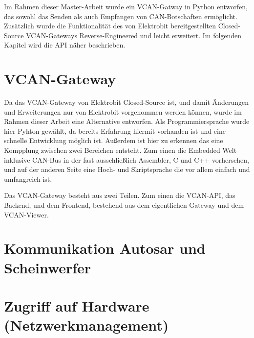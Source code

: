 \documentclass[
  a4paper,					    %
  twoside,
  DIV=calc,     				%
  bibliography=totoc,
  cleardoublepage=empty,
  ngerman,     					%
  final       					%
]{scrbook}
\begin{document}
Im Rahmen dieser Master-Arbeit wurde ein VCAN-Gatway in Python entworfen, das sowohl das Senden als auch Empfangen von CAN-Botschaften ermöglicht. Zusätzlich wurde die Funktionalität des von Elektrobit bereitgestellten Closed-Source VCAN-Gateways Reverse-Engineered und leicht erweitert. Im folgenden Kapitel wird die API näher beschrieben.



\section{VCAN-Gateway}
\label{sec:VCAN_Gateway}
Da das VCAN-Gateway von Elektrobit Closed-Source ist, und damit Änderungen und Erweiterungen nur von Elektrobit vorgenommen werden können, wurde im Rahmen dieser Arbeit eine Alternative entworfen. Als Programmiersprache wurde hier Pyhton gewählt, da bereits Erfahrung hiermit vorhanden ist und eine schnelle Entwicklung möglich ist. Außerdem ist hier zu erkennen das eine Kompplung zwischen zwei Bereichen entsteht. Zum einen die Embedded Welt inklusive CAN-Bus in der fast ausschließlich Assembler, C und C++ vorherschen, und auf der anderen Seite eine Hoch- und Skriptsprache die vor allem einfach und umfangreich ist.

Das VCAN-Gateway besteht aus zwei Teilen. Zum einen die VCAN-API, das Backend, und dem Frontend, bestehend aus dem eigentlichen Gateway und dem VCAN-Viewer.






\section{Kommunikation Autosar und Scheinwerfer}
\label{sec:Kommunikation_A_S}




\section{Zugriff auf Hardware (Netzwerkmanagement)}
\label{sec:AutosarNM}
\end{document}
